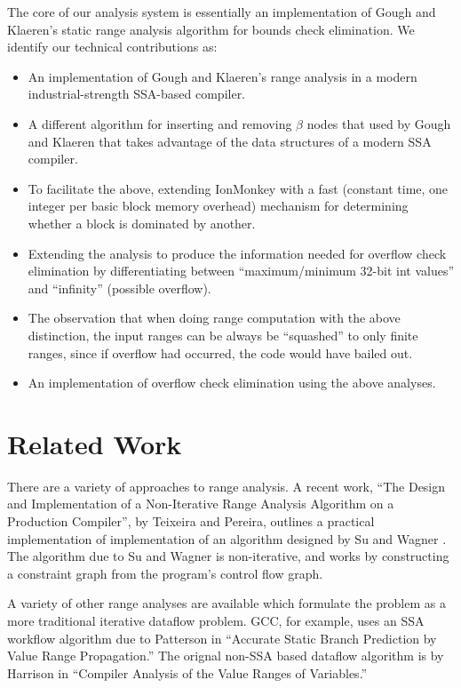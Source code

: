 \documentclass{article}
\begin{document}
The core of our analysis system is essentially an implementation of
Gough and Klaeren's static range analysis algorithm for bounds check
elimination.
We identify our technical contributions as:
\begin{itemize}
\item An implementation of Gough and Klaeren's range analysis in a
  modern industrial-strength SSA-based compiler.
\item A different algorithm for inserting and removing $\beta$ nodes
  that used by Gough and Klaeren that takes advantage of the data
  structures of a modern SSA compiler.
\item To facilitate the above, extending IonMonkey with a fast
  (constant time, one integer per basic block memory overhead) 
  mechanism for determining whether a block is dominated by another.
\item Extending the analysis to produce the information needed for
  overflow check elimination by differentiating between
  ``maximum/minimum 32-bit int values'' and ``infinity'' (possible
  overflow).
\item The observation that when doing range computation with the above
  distinction, the input ranges can be always be ``squashed'' to only
  finite ranges, since if overflow had occurred, the code would have
  bailed out.
\item An implementation of overflow check elimination using the above
  analyses.
\end{itemize}


\section{Related Work}
There are a variety of approaches to range analysis. A recent work, ``The Design
and Implementation of a Non-Iterative Range Analysis Algorithm on a
Production Compiler'', by Teixeira and Pereira, outlines a practical implementation of
implementation of an algorithm designed by Su and Wagner
\cite{Su04aclass}. The algorithm due to Su and Wagner is
non-iterative, and works by constructing a constraint graph from the program's control flow graph.

A variety of other range analyses are available which formulate the problem as
a more traditional iterative dataflow problem. GCC, for example, uses an SSA
workflow algorithm due to Patterson in ``Accurate Static Branch Prediction by
Value Range Propagation.''\cite{Patterson95accuratestatic}
The orignal non-SSA based dataflow algorithm is by
Harrison in ``Compiler Analysis of the Value Ranges of Variables.''\cite{Harrison}
\end{document}
